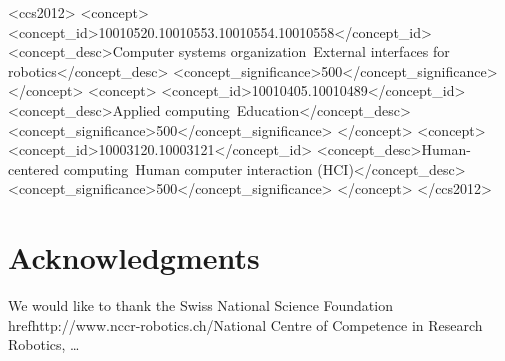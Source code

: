 \documentclass{sig-alternate-05-2015}
\begin{document}
%
%
 \begin{CCSXML}
	<ccs2012>
	<concept>
	<concept_id>10010520.10010553.10010554.10010558</concept_id>
	<concept_desc>Computer systems organization~External interfaces for robotics</concept_desc>
	<concept_significance>500</concept_significance>
	</concept>
	<concept>
	<concept_id>10010405.10010489</concept_id>
	<concept_desc>Applied computing~Education</concept_desc>
	<concept_significance>500</concept_significance>
	</concept>
	<concept>
	<concept_id>10003120.10003121</concept_id>
	<concept_desc>Human-centered computing~Human computer interaction (HCI)</concept_desc>
	<concept_significance>500</concept_significance>
	</concept>
	</ccs2012>
\end{CCSXML}


%
%

%
%
\printccsdesc




\section{Acknowledgments}
We would like to thank the Swiss National Science Foundation href{http://www.nccr-robotics.ch/}{National Centre of Competence in Research Robotics}, \dots


  
\end{document}
